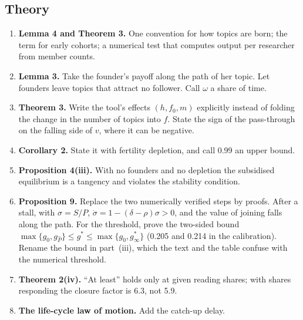 \subsection*{Theory}
\begin{enumerate}[resume]
\item \textbf{Lemma 4 and Theorem 3.} One convention for how topics are born; the term for early cohorts; a numerical test that computes output per researcher from member counts.
\item \textbf{Lemma 3.} Take the founder's payoff along the path of her topic. Let founders leave topics that attract no follower. Call $\omega$ a share of time.
\item \textbf{Theorem 3.} Write the tool's effects $(h,f_0,m)$ explicitly instead of folding the change in the number of topics into $f$. State the sign of the pass-through on the falling side of $v$, where it can be negative.
\item \textbf{Corollary 2.} State it with fertility depletion, and call 0.99 an upper bound.
\item \textbf{Proposition 4(iii).} With no founders and no depletion the subsidised equilibrium is a tangency and violates the stability condition.
\item \textbf{Proposition 9.} Replace the two numerically verified steps by proofs. After a stall, with $\sigma=S/P$, $\dot\sigma=1-(\delta-\rho)\sigma>0$, and the value of joining falls along the path. For the threshold, prove the two-sided bound $\max\{g_0,g_{\hat P}\}\le g^*\le\max\{g_0,g^*_\infty\}$ (0.205 and 0.214 in the calibration). Rename the bound in part~(iii), which the text and the table confuse with the numerical threshold.
\item \textbf{Theorem 2(iv).} ``At least'' holds only at given reading shares; with shares responding the closure factor is 6.3, not 5.9.
\item \textbf{The life-cycle law of motion.} Add the catch-up delay.
\end{enumerate}

